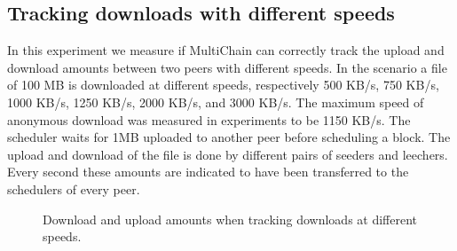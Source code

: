 \subsection{Tracking downloads with different speeds}
In this experiment we measure if MultiChain can correctly track the upload and download amounts
between two peers with different speeds.
In the scenario a file of 100 MB is downloaded at different speeds,
respectively 500 KB/s, 750 KB/s, 1000 KB/s, 1250 KB/s, 2000 KB/s, and 3000 KB/s.
The maximum speed of anonymous download was measured in experiments to be 1150 KB/s\cite{ruigrok-anonymous}.
The scheduler waits for 1MB uploaded to another peer before scheduling a block.
The upload and download of the file is done by different pairs of seeders and leechers.
Every second these amounts are indicated to have been transferred to the schedulers of every peer.

\begin{figure}
\centering
{}
\caption{Download and upload amounts when tracking downloads at different speeds.}
\label{fig:synthetic-simple-amounts}
\end{figure}

